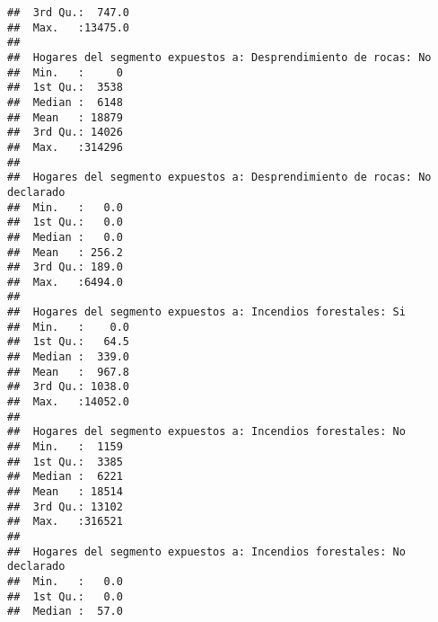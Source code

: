 \documentclass[11pt,]{article}
\begin{document}
\begin{verbatim}
##  3rd Qu.:  747.0                                               
##  Max.   :13475.0                                               
##                                                                
##  Hogares del segmento expuestos a: Desprendimiento de rocas: No
##  Min.   :     0                                                
##  1st Qu.:  3538                                                
##  Median :  6148                                                
##  Mean   : 18879                                                
##  3rd Qu.: 14026                                                
##  Max.   :314296                                                
##                                                                
##  Hogares del segmento expuestos a: Desprendimiento de rocas: No declarado
##  Min.   :   0.0                                                          
##  1st Qu.:   0.0                                                          
##  Median :   0.0                                                          
##  Mean   : 256.2                                                          
##  3rd Qu.: 189.0                                                          
##  Max.   :6494.0                                                          
##                                                                          
##  Hogares del segmento expuestos a: Incendios forestales: Si
##  Min.   :    0.0                                           
##  1st Qu.:   64.5                                           
##  Median :  339.0                                           
##  Mean   :  967.8                                           
##  3rd Qu.: 1038.0                                           
##  Max.   :14052.0                                           
##                                                            
##  Hogares del segmento expuestos a: Incendios forestales: No
##  Min.   :  1159                                            
##  1st Qu.:  3385                                            
##  Median :  6221                                            
##  Mean   : 18514                                            
##  3rd Qu.: 13102                                            
##  Max.   :316521                                            
##                                                            
##  Hogares del segmento expuestos a: Incendios forestales: No declarado
##  Min.   :   0.0                                                      
##  1st Qu.:   0.0                                                      
##  Median :  57.0                                                      

\end{verbatim}
\end{document}
